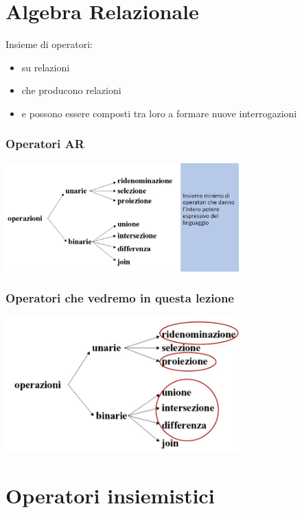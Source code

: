 \section{Algebra Relazionale}
Insieme di operatori:
\begin{itemize}
    \item su relazioni
    \item che producono relazioni
    \item e possono essere composti tra loro a formare nuove interrogazioni
\end{itemize}
\subsubsection{Operatori AR}
\begin{center}
    \includegraphics[width=0.675\textwidth]{chaptersLezioniSara/img/AR_operatori1}
\end{center}
\subsubsection{Operatori che vedremo in questa lezione}
\begin{center}
    \includegraphics[width=0.675\textwidth]{chaptersLezioniSara/img/AR_operatori2}
\end{center}

\section{Operatori insiemistici}

